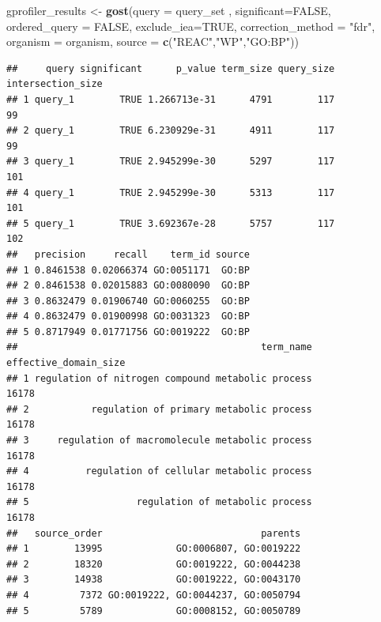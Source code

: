 \documentclass[
]{book}
\newenvironment{Shaded}{\begin{snugshade}}{\end{snugshade}}
\newcommand{\AttributeTok}[1]{\textcolor[rgb]{0.13,0.29,0.53}{#1}}
\newcommand{\CommentTok}[1]{\textcolor[rgb]{0.56,0.35,0.01}{\textit{#1}}}
\newcommand{\ConstantTok}[1]{\textcolor[rgb]{0.56,0.35,0.01}{#1}}
\newcommand{\DecValTok}[1]{\textcolor[rgb]{0.00,0.00,0.81}{#1}}
\newcommand{\FunctionTok}[1]{\textcolor[rgb]{0.13,0.29,0.53}{\textbf{#1}}}
\newcommand{\NormalTok}[1]{#1}
\newcommand{\OtherTok}[1]{\textcolor[rgb]{0.56,0.35,0.01}{#1}}
\newcommand{\SpecialCharTok}[1]{\textcolor[rgb]{0.81,0.36,0.00}{\textbf{#1}}}
\newcommand{\StringTok}[1]{\textcolor[rgb]{0.31,0.60,0.02}{#1}}
\begin{document}
\begin{Shaded}
\begin{Highlighting}[]
\NormalTok{gprofiler\_results }\OtherTok{\textless{}{-}} \FunctionTok{gost}\NormalTok{(}\AttributeTok{query =}\NormalTok{ query\_set ,}
                          \AttributeTok{significant=}\ConstantTok{FALSE}\NormalTok{,}
                          \AttributeTok{ordered\_query =} \ConstantTok{FALSE}\NormalTok{,}
                          \AttributeTok{exclude\_iea=}\ConstantTok{TRUE}\NormalTok{,}
                          \AttributeTok{correction\_method =} \StringTok{"fdr"}\NormalTok{,}
                          \AttributeTok{organism =}\NormalTok{ organism,}
                          \AttributeTok{source =} \FunctionTok{c}\NormalTok{(}\StringTok{"REAC"}\NormalTok{,}\StringTok{"WP"}\NormalTok{,}\StringTok{"GO:BP"}\NormalTok{))}
\end{Highlighting}
\end{Shaded}

\begin{Shaded}
\end{Shaded}

\begin{verbatim}
##     query significant      p_value term_size query_size intersection_size
## 1 query_1        TRUE 1.266713e-31      4791        117                99
## 2 query_1        TRUE 6.230929e-31      4911        117                99
## 3 query_1        TRUE 2.945299e-30      5297        117               101
## 4 query_1        TRUE 2.945299e-30      5313        117               101
## 5 query_1        TRUE 3.692367e-28      5757        117               102
##   precision     recall    term_id source
## 1 0.8461538 0.02066374 GO:0051171  GO:BP
## 2 0.8461538 0.02015883 GO:0080090  GO:BP
## 3 0.8632479 0.01906740 GO:0060255  GO:BP
## 4 0.8632479 0.01900998 GO:0031323  GO:BP
## 5 0.8717949 0.01771756 GO:0019222  GO:BP
##                                           term_name effective_domain_size
## 1 regulation of nitrogen compound metabolic process                 16178
## 2           regulation of primary metabolic process                 16178
## 3     regulation of macromolecule metabolic process                 16178
## 4          regulation of cellular metabolic process                 16178
## 5                   regulation of metabolic process                 16178
##   source_order                            parents
## 1        13995             GO:0006807, GO:0019222
## 2        18320             GO:0019222, GO:0044238
## 3        14938             GO:0019222, GO:0043170
## 4         7372 GO:0019222, GO:0044237, GO:0050794
## 5         5789             GO:0008152, GO:0050789
\end{verbatim}
\end{document}
